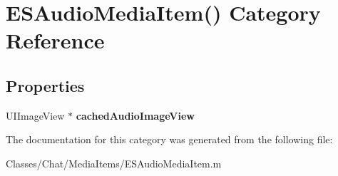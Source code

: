\hypertarget{category_e_s_audio_media_item_07_08}{}\section{E\+S\+Audio\+Media\+Item() Category Reference}
\label{category_e_s_audio_media_item_07_08}
\subsection*{Properties}
\begin{DoxyCompactItemize}
\item 
\hypertarget{category_e_s_audio_media_item_07_08_a3fd41e2ddcb6b1310d3516f7e0a69c18}{}U\+I\+Image\+View $\ast$ {\bfseries cached\+Audio\+Image\+View}\label{category_e_s_audio_media_item_07_08_a3fd41e2ddcb6b1310d3516f7e0a69c18}

\end{DoxyCompactItemize}


The documentation for this category was generated from the following file\+:\begin{DoxyCompactItemize}
\item 
Classes/\+Chat/\+Media\+Items/E\+S\+Audio\+Media\+Item.\+m\end{DoxyCompactItemize}
